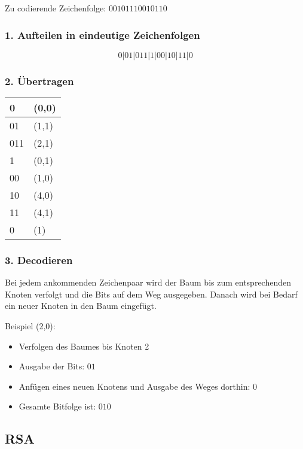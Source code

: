 Zu codierende Zeichenfolge: $00101110010110$

\subsubsection*{1. Aufteilen in eindeutige Zeichenfolgen}

\[
	0|01|011|1|00|10|11|0
\]

\subsubsection*{2. Übertragen}

\begin{minipage}{.4\linewidth}
	\begin{tabular}[H]{|l|l|}
		\hline
		0 & (0,0) \\
		\hline
		01 & (1,1) \\
		\hline
		011 & (2,1) \\
		\hline
		1 & (0,1) \\
		\hline
		00 & (1,0) \\
		\hline
		10 & (4,0) \\
		\hline
		11 & (4,1) \\
		\hline
		0 & (1) \\
		\hline
	\end{tabular}
\end{minipage}
\begin{minipage}{.6\linewidth}
	
\end{minipage}

\subsubsection*{3. Decodieren}

Bei jedem ankommenden Zeichenpaar wird der Baum bis zum entsprechenden Knoten
verfolgt und die Bits auf dem Weg ausgegeben. Danach wird bei Bedarf ein neuer
Knoten in den Baum eingefügt.

Beispiel (2,0):
\begin{itemize}
	\item Verfolgen des Baumes bis Knoten 2
	\item Ausgabe der Bits: $01$
	\item Anfügen eines neuen Knotens und Ausgabe des Weges dorthin: $0$
	\item Gesamte Bitfolge ist: $010$
\end{itemize}


\subsection{RSA}
\label{example:rsa}

